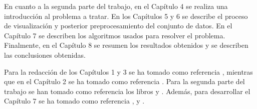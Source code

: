 En cuanto a la segunda parte del trabajo, en el Capítulo 4 se realiza una introducción al problema a tratar. 
En los Capítulos 5 y 6 se describe el proceso de visualización y posterior preprocesamiento del conjunto de datos.
En el Capítulo 7 se describen los algoritmos usados para resolver el problema.
Finalmente, en el Capítulo 8 se resumen los resultados obtenidos y se describen las conclusiones obtenidas.

\medskip 

Para la redacción de los Capítulos 1 y 3 se ha tomado como referencia \cite{libro_esfarm}, mientras que en el Capítulo 2 se ha tomado como referencia \cite{art_grad}. Para la segunda parte del trabajo se han tomado como referencia los libros \cite{data_mining} y \cite{clasification}. Además, para desarrollar el Capítulo 7 se ha tomado como referencia \cite{boosting}, \cite{rusboost} y \cite{cusboost}. 